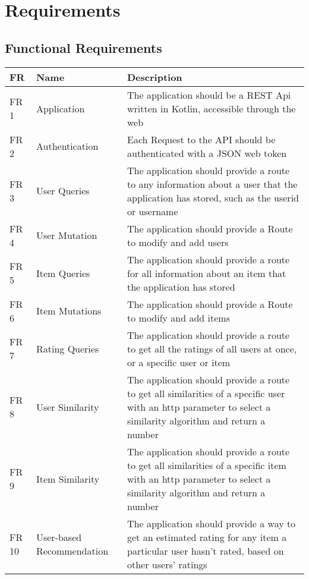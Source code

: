 \chapter{Requirements}

\section{Functional Requirements}

\begin{longtable}{|p{1.2cm}||p{3.2cm}|p{9cm}|}
    \hline
	  FR & Name & Description \\
	\hline
	FR 1 & Application    & The application should be a REST Api written in Kotlin, accessible through the web \\
    \hline
	FR 2 & Authentication & Each Request to the API should be authenticated with a JSON web token \\
	\hline
    FR 3 & User Queries & The application should provide a route to any information about a user that the application has stored, such as the userid or username \\
	\hline
    FR 4 & User Mutation & The application should provide a Route to modify and add users \\
	\hline
    FR 5 & Item Queries & The application should provide a route for all information about an item that the application has stored\\
	\hline
    FR 6 & Item Mutations & The application should provide a Route to modify and add items \\
	\hline
    FR 7 & Rating Queries & The application should provide a route to get all the ratings of all users at once, or a specific user or item\\
	\hline
    FR 8 & User Similarity & The application should provide a route to get all similarities of a specific user with an http parameter to select a similarity algorithm and return a number \\
	\hline
    FR 9 & Item Similarity & The application should provide a route to get all similarities of a specific item with an http parameter to select a similarity algorithm and return a number  \\
	\hline
    FR 10 & User-based Recommendation & The application should provide a way to get an estimated rating for any item a particular user hasn't rated, based on other users' ratings \\

\end{longtable}
